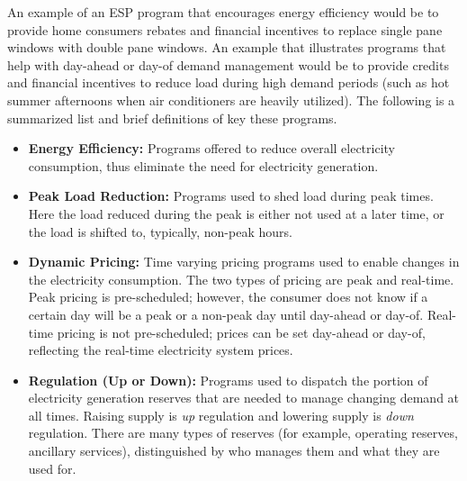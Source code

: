 An example of an ESP program that encourages energy efficiency would be to provide home consumers rebates and financial incentives to replace single pane windows with double pane windows. An example that illustrates programs that help with day-ahead or day-of demand management would be to provide credits and financial incentives to reduce load during high demand periods (such as hot summer afternoons when air conditioners are heavily utilized). The following is a summarized list and brief definitions of key these programs.

\begin{itemize}
\item {\bf Energy Efficiency:} Programs offered to reduce overall electricity consumption, thus eliminate the need for electricity generation.
\item {\bf Peak Load Reduction:} Programs used to shed load during peak times. Here the load reduced during the peak is either not used at a later time, or the load is shifted to, typically, non-peak hours. 

\item {\bf Dynamic Pricing:}  Time varying pricing programs used to enable changes in the electricity consumption. 
The two types of pricing are peak and real-time.  Peak pricing is pre-scheduled; however, the consumer 
does not know if a certain day will be a peak or a non-peak day until day-ahead or day-of.  
Real-time pricing is not pre-scheduled; prices can be set day-ahead or day-of, reflecting the real-time electricity system prices.

\item {\bf Regulation (Up or Down):} Programs used to dispatch the portion of electricity generation reserves that are needed to manage changing demand at all times. Raising supply is \emph{up} regulation and lowering 
supply is \emph{down} regulation. There are many types of reserves (for example, operating reserves, ancillary services), distinguished by who manages them and what they are used for.
\end{itemize}


